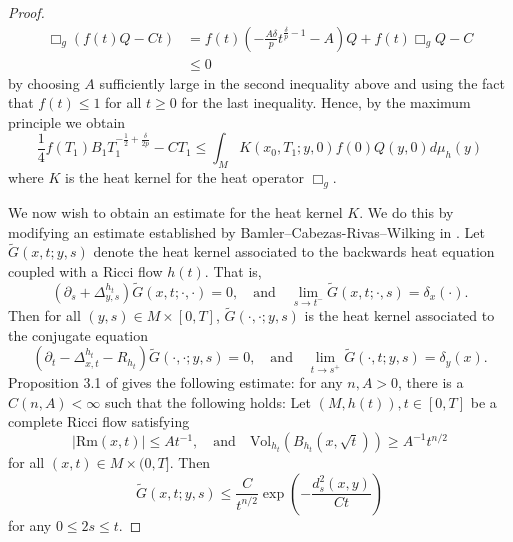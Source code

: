 \documentclass[12pt]{amsart}
\theoremstyle{remark}
\numberwithin{equation}{section}
\begin{document}
\begin{proof}
\begin{align}
        \Box_g\left(f(t)Q-Ct\right) &= f(t)\left(-\frac{A\delta}{p}t^{\frac{\delta}{p}-1} - A\right)Q + f(t)\Box_g Q - C \nonumber \\
        & \leq 0
    \end{align}
    by choosing $A$ sufficiently large in the second inequality above and using the fact that $f(t) \leq 1$ for all $t \geq 0$ for the last inequality.
    Hence, by the maximum principle we obtain
    \begin{equation}\label{eqn:gradient-estimate-invoke-heat-kernel}
        \frac14 f(T_1)B_1T_1^{-\frac{1}{2}+\frac{\delta}{2p}} - CT_1 \leq \int_{M} K(x_0, T_1; y, 0)f(0)Q(y,0)d\mu_h(y)
    \end{equation}
    where $K$ is the heat kernel for the heat operator $\Box_g$.
    
    We now wish to obtain an estimate for the heat kernel $K$. We do this by modifying an estimate established by Bamler--Cabezas-Rivas--Wilking in \cite{bamler_ricci_2017}. Let $\widetilde{G}(x,t;y,s)$ denote the heat kernel associated to the backwards heat equation coupled with a Ricci flow $h(t)$. That is,
    \begin{equation*}
        \left(\partial_s + \Delta^{h_t}_{y,s}\right)\widetilde{G}(x,t;\cdot,\cdot) = 0,\quad \text{and} \quad \lim\limits_{s\to t^-}\widetilde{G}(x,t;\cdot,s) = \delta_x(\cdot).
    \end{equation*}
    Then for all $(y,s) \in M \times [0,T]$, $\widetilde{G}(\cdot,\cdot;y,s)$ is the heat kernel associated to the conjugate equation
    \begin{equation*}
        \left(\partial_t - \Delta^{h_t}_{x,t} - R_{h_t}\right)\widetilde{G}(\cdot,\cdot;y,s) = 0,\quad \text{and} \quad \lim\limits_{t\to s^+}\widetilde{G}(\cdot,t;y,s) = \delta_y(x).
    \end{equation*}
    Proposition 3.1 of \cite{bamler_ricci_2017} gives the following estimate: for any $n, A > 0$, there is a $C(n,A) < \infty$ such that the following holds: Let $(M, h(t)), t\in[0,T]$ be a complete Ricci flow satisfying
    \begin{equation}\label{eqn:BCW-estimate-heat-kernel-assumptions}
        |\text{Rm}(x,t)| \leq At^{-1},\quad \text{and} \quad \text{Vol}_{h_t}\left(B_{h_t}(x,\sqrt{t})\right) \geq A^{-1}t^{n/2}
    \end{equation}
    for all $(x,t)\in M\times(0,T]$. Then
    \begin{equation}\label{eqn:BCW-estimate}
        \widetilde{G}(x,t;y,s) \leq \frac{C}{t^{n/2}}\exp{\left(-\frac{d^2_s(x,y)}{Ct}\right)}
    \end{equation}
    for any $0 \leq 2s \leq t$. 
    

\end{proof}
\end{document}
